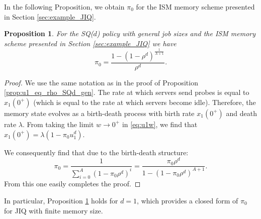 \documentclass[12pt]{report}
\newtheorem{proposition}[theorem]{Proposition}
\begin{document}
In the following Proposition, we obtain $\pi_0$ for the ISM memory scheme presented in Section \ref{sec:example_JIQ}.
\begin{proposition} \label{prop:pi_0_JIQ_SQd_gen}
For the SQ($d$) policy with general job sizes and the ISM memory scheme presented in Section \ref{sec:example_JIQ} we have 
$$
\pi_0=\frac{1-(1-\rho^d)^{\frac{1}{A+1}}}{\rho^d}.
$$
\end{proposition}
\begin{proof}
We use the same notation as in the proof of Proposition \ref{prop:u1_eq_rho_SQd_gen}. 
The rate at which servers send probes is equal to $x_1(0^+)$ (which is equal to the rate at which servers become idle). Therefore, the memory state evolves as a birth-death process with  birth rate $x_1(0^+)$ and death rate $\lambda$. From taking the limit $w\rightarrow 0^+$ in \eqref{eq:u1w}, we find that $x_1(0^+)= \lambda (1- \pi_0 u_1^d)$.

We consequently find that due to the birth-death structure:
\[
\pi_0 = \frac{1}{\sum_{i=0}^A (1-\pi_0 \rho^d)^i}=\frac{\pi_0 \rho^d}{1- (1-\pi_0 \rho^d)^{A+1}}.
\]
From this one easily completes the proof.
\end{proof}
In particular, Proposition \ref{prop:pi_0_JIQ_SQd_gen} holds for $d=1$, which provides a closed form of $\pi_0$ for JIQ with finite memory size.
\end{document}
